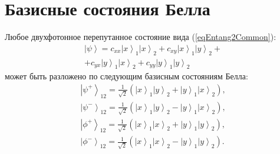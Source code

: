 \section{Базисные состояния Белла}

Любое двухфотонное перепутанное состояние вида (\ref{eqEntang2Common}):
\begin{eqnarray}
\left|\psi\right> =  
c_{xx} \left|x\right>_1\left|x\right>_2 +
c_{xy} \left|x\right>_1\left|y\right>_2 +
\nonumber \\
+
c_{yx} \left|y\right>_1\left|x\right>_2 +
c_{yy} \left|y\right>_1\left|y\right>_2
\nonumber
\end{eqnarray}
может быть разложено по следующим базисным состояниям Белла:
\begin{eqnarray}
  \left|\psi^{+}\right>_{12} = 
  \frac{1}{\sqrt{2}}\left(
  \left|x\right>_1\left|y\right>_2 + 
  \left|y\right>_1\left|x\right>_2
  \right),
  \nonumber \\
  \left|\psi^{-}\right>_{12} = 
  \frac{1}{\sqrt{2}}\left(
  \left|x\right>_1\left|y\right>_2 - 
  \left|y\right>_1\left|x\right>_2
  \right),
  \nonumber \\
  \left|\phi^{+}\right>_{12} = 
  \frac{1}{\sqrt{2}}\left(
  \left|x\right>_1\left|x\right>_2 + 
  \left|y\right>_1\left|y\right>_2
  \right),
  \nonumber \\
  \left|\phi^{-}\right>_{12} = 
  \frac{1}{\sqrt{2}}\left(
  \left|x\right>_1\left|x\right>_2 - 
  \left|y\right>_1\left|y\right>_2
  \right).
  \label{eqEntangBellBase}
\end{eqnarray}
 
